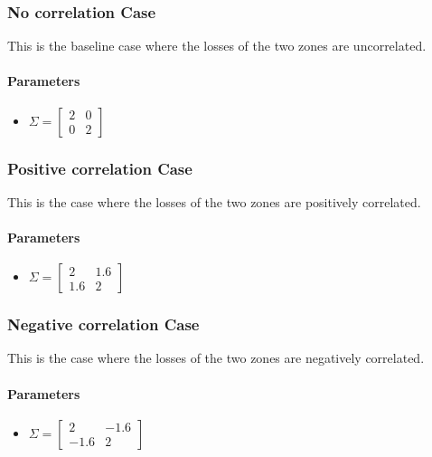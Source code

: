 \documentclass[11pt]{article}
\begin{document}
    \subsubsection*{No correlation Case}
    This is the baseline case where the losses of the two zones are uncorrelated. 
        \paragraph*{Parameters}
        \begin{itemize}
            \item $\Sigma = \begin{bmatrix}
                2 & 0 \\
                0 & 2 
                \end{bmatrix} $
        \end{itemize}

    \subsubsection*{Positive correlation Case}
    This is the case where the losses of the two zones are positively correlated. 
    \paragraph*{Parameters}
    \begin{itemize}
        \item $\Sigma = \begin{bmatrix}
            2 & 1.6 \\
            1.6 & 2 
            \end{bmatrix} $
    \end{itemize}

    \subsubsection*{Negative correlation Case}
    This is the case where the losses of the two zones are negatively correlated. 
    \paragraph*{Parameters}
    \begin{itemize}
        \item $\Sigma = \begin{bmatrix}
            2 & -1.6 \\
            -1.6 & 2 
            \end{bmatrix} $
    \end{itemize}
\end{document}
